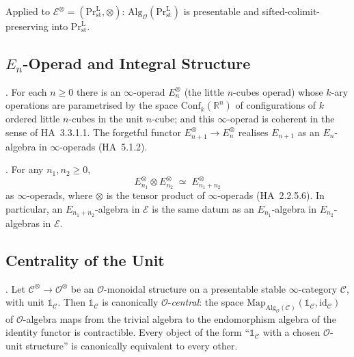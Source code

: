 Applied to
\(\mathcal{E}^{\otimes}=(\mathrm{Pr}^{\mathrm{L}}_{\mathrm{st}},\otimes)\):
\(\mathrm{Alg}_{\mathcal{O}}(\mathrm{Pr}^{\mathrm{L}}_{\mathrm{st}})\)
is presentable and sifted-colimit-preserving into
\(\mathrm{Pr}^{\mathrm{L}}_{\mathrm{st}}\).

\subsection{\(E_{n}\)-Operad and Integral Structure}
\label{v4-arith:tate:prelim-En}

\begin{theorem}
\label{v4-arith:tate:thm:En-operad}
\ClaimStatusProvedElsewhere. For each \(n\geq 0\) there is an
\(\infty\)-operad \(E_{n}^{\otimes}\) (the little \(n\)-cubes operad)
whose \(k\)-ary operations are parametrised by the space
\(\mathrm{Conf}_{k}(\mathbb{R}^{n})\) of configurations of \(k\) ordered
little \(n\)-cubes in the unit \(n\)-cube; and this \(\infty\)-operad is
coherent in the sense of HA~3.3.1.1. The forgetful functor
\(E_{n+1}^{\otimes}\to E_{n}^{\otimes}\) realises \(E_{n+1}\) as an
\(E_{n}\)-algebra in \(\infty\)-operads (HA~5.1.2).
\end{theorem}

\begin{theorem}
\label{v4-arith:tate:thm:dunn-additivity}
\ClaimStatusProvedElsewhere. For any \(n_{1},n_{2}\geq 0\),
\[
E_{n_{1}}^{\otimes}\otimes E_{n_{2}}^{\otimes}\;\simeq\;E_{n_{1}+n_{2}}^{\otimes}
\]
as \(\infty\)-operads, where \(\otimes\) is the tensor product of
\(\infty\)-operads (HA~2.2.5.6). In particular, an
\(E_{n_{1}+n_{2}}\)-algebra in \(\mathcal{E}\) is the same datum as an
\(E_{n_{1}}\)-algebra in \(E_{n_{2}}\)-algebras in \(\mathcal{E}\).
\end{theorem}

\subsection{Centrality of the Unit}
\label{v4-arith:tate:prelim-central}

\begin{theorem}[HA~5.1.2.26; HA~5.3.1.14]
\label{v4-arith:tate:thm:unit-central}
\ClaimStatusProvedElsewhere. Let \(\mathcal{C}^{\otimes}\to\mathcal{O}^{\otimes}\)
be an \(\mathcal{O}\)-monoidal structure on a presentable stable
\(\infty\)-category \(\mathcal{C}\), with unit \(\mathbb{1}_{\mathcal{C}}\).
Then \(\mathbb{1}_{\mathcal{C}}\) is canonically
\(\mathcal{O}\)-\emph{central}: the space
\(\mathrm{Map}_{\mathrm{Alg}_{\mathcal{O}}(\mathcal{C})}(\mathbb{1}_{\mathcal{C}},\mathrm{id}_{\mathcal{C}})\)
of \(\mathcal{O}\)-algebra maps from the trivial algebra to the
endomorphism algebra of the identity functor is contractible. Every
object of the form ``\(\mathbb{1}_{\mathcal{C}}\) with a chosen \(\mathcal{O}\)-unit
structure'' is canonically equivalent to every other.
\end{theorem}


